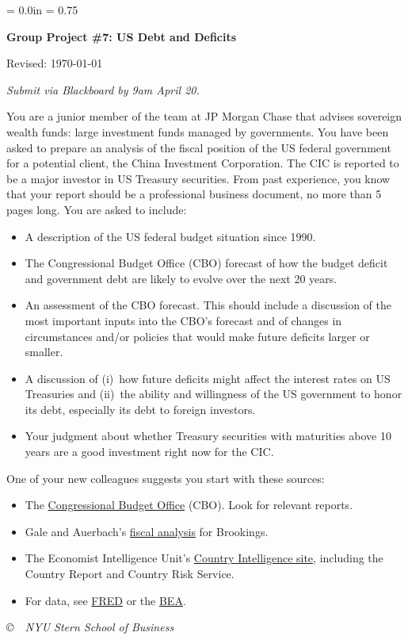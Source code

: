 \documentclass[12pt]{article}
\def\HeadName{Group Project \#7: US Debt and Deficits}
\begin{document}
\parindent = 0.0in
\parskip = 0.75\bigskipamount
\thispagestyle{empty}%
\Head

\centerline{\large \bf \HeadName}%
\centerline{Revised:  \today}

\medskip
{\it Submit via Blackboard by 9am April 20.}
\medskip

You are a junior member of the team at JP Morgan Chase 
that advises sovereign wealth funds:  
large investment funds managed by governments.  
You have been asked to prepare an analysis of 
the fiscal position of the US federal government 
for a potential client, the China Investment Corporation.  
The CIC is reported to be a major investor in US Treasury securities.  
From past experience, you know that your report should 
be a professional business document, 
no more than 5 pages long.
You are asked to include:  
%
\begin{itemize} 

\item A description of the US federal budget situation since 1990.  

\item The Congressional Budget Office (CBO) 
forecast of how the budget deficit and  government debt 
are likely to evolve over the next 20 years.  

\item An assessment of the CBO forecast.  
This should include a discussion of the most important inputs 
into the CBO's forecast 
and of changes in circumstances and/or policies 
that would make future deficits larger or smaller.  

\item A discussion of (i)~how future deficits might affect
the interest rates on US Treasuries and (ii)~the ability and willingness
of the US government to honor its debt, especially its debt to foreign 
investors.  

\item Your judgment about whether Treasury securities 
with maturities above 10 years 
are a good investment right now for the CIC.  
\end{itemize}
%

One of your new colleagues suggests you start with these sources:  
%
\begin{itemize}
\item The  
\href{http://www.cbo.gov/publications/}
{Congressional Budget Office} (CBO).  
Look for relevant reports.  

\item Gale and Auerbach's 
\href{http://www.brookings.edu/papers/2009/06_fiscal_crisis_gale.aspx}
{fiscal analysis} 
for Brookings.  

\item The Economist Intelligence Unit's
\href{http://db.eiu.com/index.asp?layout=publicationTypes}
{Country Intelligence site},  
including the Country Report and Country Risk Service.  

\item For data, see 
\href{http://research.stlouisfed.org/fred2/}{FRED} or the 
\href{http://www.bea.gov/National/nipaweb/Index.asp}{BEA}.
\end{itemize}

\vfill \centerline{\it \copyright \ \number\year \
 NYU Stern School of Business}
\end{document}
